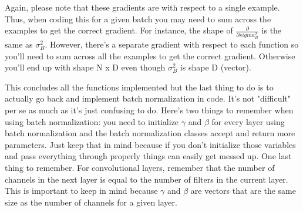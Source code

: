 \documentclass[12pt]{article}
\begin{document}
Again, please note that these gradients are with respect to a single example. Thus, 
when coding this for a given batch you may need to sum across the examples to get 
the correct gradient. For instance, the shape of $\frac{\partial}{\partial sigma_B^2}$ 
is the same as $\sigma_B^2$. However, there's a separate gradient with respect to each function 
so you'll need to sum across all the examples to get the correct gradient. Otherwise 
you'll end up with shape N x D even though $\sigma_B^2$ is shape D (vector). 

This concludes all the functions implemented but the last thing to do is to actually 
go back and implement batch normalization in code. It's not "difficult" per se as much 
as it's just confusing to do. Here's two things to remember when using batch 
normalization: you need to initialize $\gamma$ and $\beta$ for every layer using batch normalization 
and the batch normalization classes accept and return more parameters. Just keep that in mind 
because if you don't initialize those variables and pass everything through properly things 
can easily get messed up. One last thing to remember. For convolutional layers, remember that the number 
of channels in the next layer is equal to the number of filters in the current layer. This 
is important to keep in mind because $\gamma$ and $\beta$ are vectors that are the same 
size as the number of channels for a given layer. 




\end{document}
